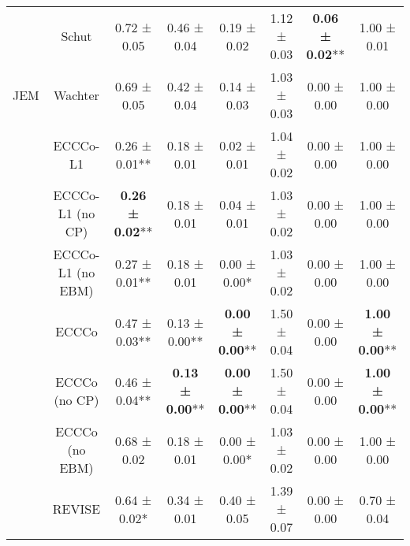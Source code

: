 \begin{table}
{\begin{tabular}[t]{cccccccc}
 & Schut & 0.72 ± 0.05\hphantom{*}\hphantom{*} & 0.46 ± 0.04\hphantom{*}\hphantom{*} & 0.19 ± 0.02\hphantom{*}\hphantom{*} & 1.12 ± 0.03\hphantom{*}\hphantom{*} & \textbf{0.06 ± 0.02}** & 1.00 ± 0.01\hphantom{*}\hphantom{*}\\

\multirow[t]{-9}{*}{\centering\arraybackslash JEM} & Wachter & 0.69 ± 0.05\hphantom{*}\hphantom{*} & 0.42 ± 0.04\hphantom{*}\hphantom{*} & 0.14 ± 0.03\hphantom{*}\hphantom{*} & 1.03 ± 0.03\hphantom{*}\hphantom{*} & 0.00 ± 0.00\hphantom{*}\hphantom{*} & 1.00 ± 0.00\hphantom{*}\hphantom{*}\\
\cmidrule{1-8}
 & ECCCo-L1 & 0.26 ± 0.01** & 0.18 ± 0.01\hphantom{*}\hphantom{*} & 0.02 ± 0.01\hphantom{*}\hphantom{*} & 1.04 ± 0.02\hphantom{*}\hphantom{*} & 0.00 ± 0.00\hphantom{*}\hphantom{*} & 1.00 ± 0.00\hphantom{*}\hphantom{*}\\

 & ECCCo-L1 (no CP) & \textbf{0.26 ± 0.02}** & 0.18 ± 0.01\hphantom{*}\hphantom{*} & 0.04 ± 0.01\hphantom{*}\hphantom{*} & 1.03 ± 0.02\hphantom{*}\hphantom{*} & 0.00 ± 0.00\hphantom{*}\hphantom{*} & 1.00 ± 0.00\hphantom{*}\hphantom{*}\\

 & ECCCo-L1 (no EBM) & 0.27 ± 0.01** & 0.18 ± 0.01\hphantom{*}\hphantom{*} & 0.00 ± 0.00*\hphantom{*} & 1.03 ± 0.02\hphantom{*}\hphantom{*} & 0.00 ± 0.00\hphantom{*}\hphantom{*} & 1.00 ± 0.00\hphantom{*}\hphantom{*}\\

 & ECCCo & 0.47 ± 0.03** & 0.13 ± 0.00** & \textbf{0.00 ± 0.00}** & 1.50 ± 0.04\hphantom{*}\hphantom{*} & 0.00 ± 0.00\hphantom{*}\hphantom{*} & \textbf{1.00 ± 0.00}**\\

 & ECCCo (no CP) & 0.46 ± 0.04** & \textbf{0.13 ± 0.00}** & \textbf{0.00 ± 0.00}** & 1.50 ± 0.04\hphantom{*}\hphantom{*} & 0.00 ± 0.00\hphantom{*}\hphantom{*} & \textbf{1.00 ± 0.00}**\\

 & ECCCo (no EBM) & 0.68 ± 0.02\hphantom{*}\hphantom{*} & 0.18 ± 0.01\hphantom{*}\hphantom{*} & 0.00 ± 0.00*\hphantom{*} & 1.03 ± 0.02\hphantom{*}\hphantom{*} & 0.00 ± 0.00\hphantom{*}\hphantom{*} & 1.00 ± 0.00\hphantom{*}\hphantom{*}\\

 & REVISE & 0.64 ± 0.02*\hphantom{*} & 0.34 ± 0.01\hphantom{*}\hphantom{*} & 0.40 ± 0.05\hphantom{*}\hphantom{*} & 1.39 ± 0.07\hphantom{*}\hphantom{*} & 0.00 ± 0.00\hphantom{*}\hphantom{*} & 0.70 ± 0.04\hphantom{*}\hphantom{*}\\


\end{tabular}}
\end{table}

